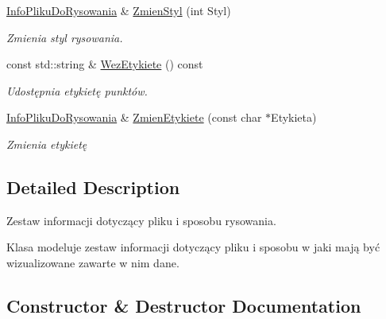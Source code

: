 \begin{DoxyCompactItemize}
\mbox{\hyperlink{class_pz_g_1_1_info_pliku_do_rysowania}{Info\+Pliku\+Do\+Rysowania}} \& \mbox{\hyperlink{class_pz_g_1_1_info_pliku_do_rysowania_a2a7e9e212905112c6f236fe1d0a1f2ec}{Zmien\+Styl}} (int Styl)
\begin{DoxyCompactList}\small\item\em Zmienia styl rysowania. \end{DoxyCompactList}\item 
const std\+::string \& \mbox{\hyperlink{class_pz_g_1_1_info_pliku_do_rysowania_ad73ee82ce7a07a63f3229a2add04b93d}{Wez\+Etykiete}} () const
\begin{DoxyCompactList}\small\item\em Udostępnia etykietę punktów. \end{DoxyCompactList}\item 
\mbox{\hyperlink{class_pz_g_1_1_info_pliku_do_rysowania}{Info\+Pliku\+Do\+Rysowania}} \& \mbox{\hyperlink{class_pz_g_1_1_info_pliku_do_rysowania_a1497c20c07dd13c716ff76d3cc4d7cf3}{Zmien\+Etykiete}} (const char $\ast$Etykieta)
\begin{DoxyCompactList}\small\item\em Zmienia etykietę \end{DoxyCompactList}\end{DoxyCompactItemize}


\subsection{Detailed Description}
Zestaw informacji dotyczący pliku i sposobu rysowania. 

Klasa modeluje zestaw informacji dotyczący pliku i sposobu w jaki mają być wizualizowane zawarte w nim dane. 

\subsection{Constructor \& Destructor Documentation}
\mbox{\label{class_pz_g_1_1_info_pliku_do_rysowania_a42f5a6ba16403a4364158fa46176ff7a}} 

